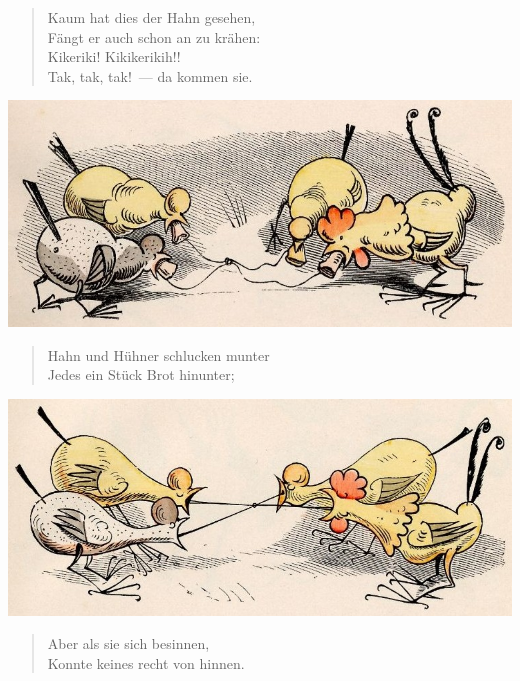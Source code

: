 \documentclass[a4paper,12pt]{article}
\begin{document}
\begin{verse}
Kaum hat dies der Hahn gesehen,\\{}
Fängt er auch schon an zu krähen:\\{}
Kikeriki! Kikikerikih!!\\{}
Tak, tak, tak!~— da kommen sie.
\end{verse}



\begin{center}\includegraphics[scale=.7, alt={... und schlucken das Brot}]{images/1-05.jpg}\end{center}



\begin{verse}
Hahn und Hühner schlucken munter\\{}
Jedes ein Stück Brot hinunter;
\end{verse}



\begin{center}\includegraphics[scale=.7, alt={Keines kann von hinnen}]{images/1-06.jpg}\end{center}



\begin{verse}
Aber als sie sich besinnen,\\{}
Konnte keines recht von hinnen.
\end{verse}
\end{document}
